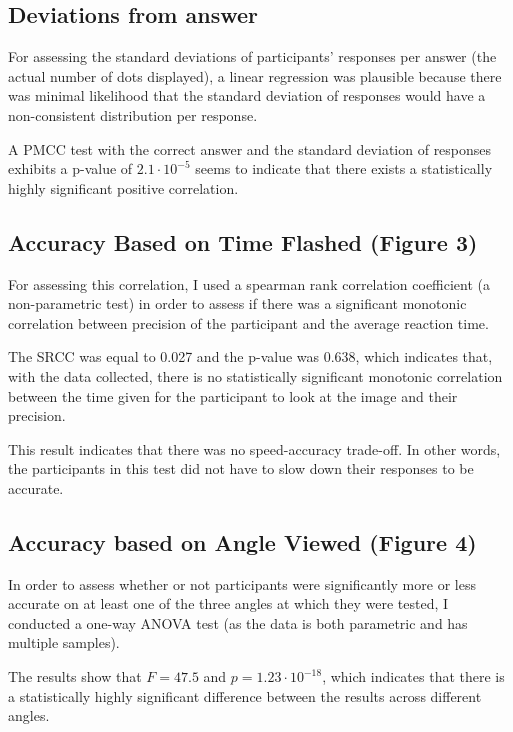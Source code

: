 \documentclass[12pt]{article}
\begin{document}
\subsection{Deviations from answer}

For assessing the standard deviations of participants' responses per answer
(the actual number of dots displayed), a linear regression was plausible
because there was minimal likelihood that the standard deviation of responses
would have a non-consistent distribution per response.

A PMCC test with the correct answer and the standard deviation of responses
exhibits a p-value of $2.1 \cdot 10^{-5}$ seems to indicate that there exists a
statistically highly significant positive correlation.

\subsection{Accuracy Based on Time Flashed (Figure 3)}

For assessing this correlation, I used a spearman rank correlation coefficient
(a non-parametric test) in order to assess if there was a significant monotonic
correlation between precision of the participant and the average reaction time.

The SRCC was equal to 0.027 and the p-value was 0.638, which indicates that,
with the data collected, there is no statistically significant
monotonic correlation between the time given for the participant to look at the
image and their precision.

This result indicates that there was no speed-accuracy trade-off. In other
words, the participants in this test did not have to slow down their responses
to be accurate.

\subsection{Accuracy based on Angle Viewed (Figure 4)}

In order to assess whether or not participants were significantly more or less
accurate on at least one of the three angles at which they were tested, I
conducted a one-way ANOVA test (as the data is both parametric and has multiple
samples).

The results show that $F=47.5$ and $p = 1.23 \cdot 10^{-18}$, which indicates
that there is a statistically highly significant difference between the results
across different angles.
\end{document}
